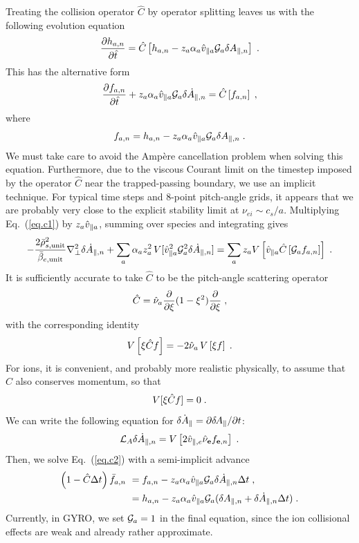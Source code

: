 Treating the collision operator $\hat{C}$ by operator splitting 
leaves us with the following evolution equation 
%
\begin{equation}
\frac{\partial h_{a,n}}{\partial\hat{t}} = 
 \hat{C}\left[h_{a,n} - z_a \alpha_a \hat{v}_{\parallel a} {\cal G}_a \delta A_{\parallel,n} \right] \; .
\label{eq.c1}
\end{equation}
%
This has the alternative form
\begin{equation}
\frac{\partial f_{a,n}}{\partial\hat{t}} + z_a \alpha_a \hat{v}_{\parallel a} 
 {\cal G}_a \delta \dot{A}_{\parallel,n} = \hat{C}\left[f_{a,n} \right] \; ,
\label{eq.c2}
\end{equation}
%
where
%
\begin{equation}
f_{a,n} = h_{a,n} - z_a \alpha_a \hat{v}_{\parallel a} {\cal G}_a \delta A_{\parallel,n} \; . 
\end{equation}
%
We must take care to avoid the Amp\`ere cancellation problem
when solving this equation.  Furthermore, due to the viscous 
Courant limit on the timestep imposed by the operator $\hat{C}$ 
near the trapped-passing boundary, we use an implicit technique.
For typical time steps and 8-point pitch-angle grids, it appears 
that we are probably very close to the explicit stability limit 
at $\nu_{ei} \sim c_s/a$. Multiplying Eq.~(\ref{eq.c1}) by 
$z_a \hat{v}_{\parallel a}$, summing over species and integrating gives 
%
\begin{equation}
-\frac{2\bar{\rho}_{s,{\rm unit}}^2}{\bar{\beta}_{e,{\rm unit}}} \nabla_\perp^2 \delta \dot{A}_{\parallel,n} + 
\sum_a \alpha_a z_a^2 \, V[\hat{v}_{\parallel a}^2 {\cal G}^2_a\delta \dot{A}_{\parallel,n}] = 
 \sum_a z_a  
 V\left[ \hat{v}_{\parallel a} \hat{C} \left[ {\cal G}_a f_{a,n} \right] \right] \; .
\end{equation}
%
It is sufficiently accurate to take $\hat{C}$ to be the pitch-angle 
scattering operator 
% 
\begin{equation}
\hat{C} = \hat{\nu}_a \frac{\partial}{\partial \xi}
(1-\xi^2) \frac{\partial}{\partial\xi} \; ,
\end{equation}
%
with the corresponding identity
%
\begin{equation}
V\left[ \xi \hat{C} f \right] 
 = - 2 \hat{\nu}_a \, V\left[ \xi f \right]  \; .
\end{equation}
%
For ions, it is convenient, and probably more realistic physically, 
to assume that $\hat{C}$ also conserves momentum, so that 
%
\begin{equation}
V[ \xi \hat{C} f ] = 0 \; .
\end{equation}
%
We can write the following equation for $\dot{\delta A_\parallel} = \partial\delta \hskip -1pt A_\parallel/\partial t$:
%
\begin{equation}
{\cal L}_A \delta \dot{A}_{\parallel,n} = V\left[ 2 \hat{v}_{\parallel,e} \hat{\nu}_{\bf e} f_{{\bf e},n} 
\right] \; .
\end{equation}
%
Then, we solve Eq.~(\ref{eq.c2}) with a semi-implicit advance
%
\begin{align}
\left( 1- \hat{C} \Delta t \right) \bar{f}_{a,n} 
 &~= f_{a,n} - z_a \alpha_a \hat{v}_{\parallel a} {\cal G}_a \delta \dot{A}_{\parallel,n} \Delta t \; , \\
 &~= h_{a,n} - z_a \alpha_a \hat{v}_{\parallel a} {\cal G}_a (\delta A_{\parallel,n} + \delta \dot{A}_{\parallel,n} \Delta t) \; .
\end{align}
%
Currently, in GYRO, we set ${\cal G}_a = 1$ in the final equation, 
since the ion collisional effects are weak and already rather 
approximate.

